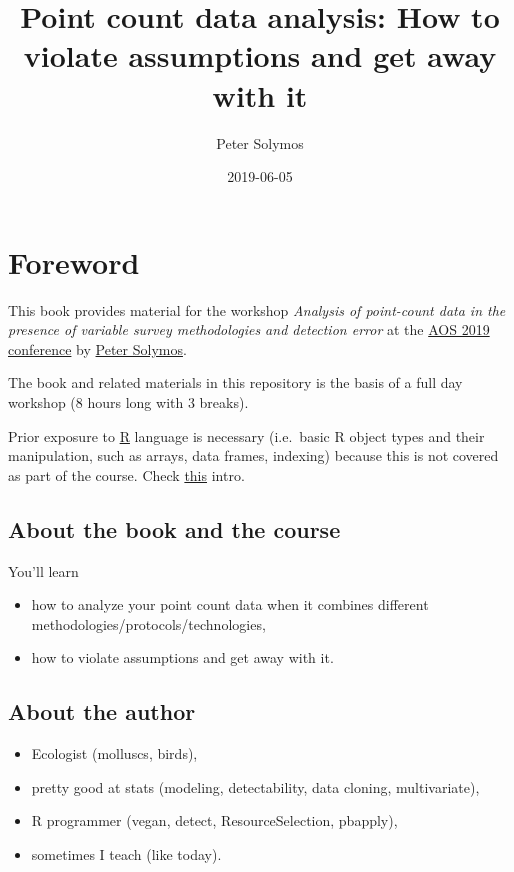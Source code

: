 \documentclass[12pt,]{book}
\title{Point count data analysis: How to violate assumptions and get away with it}
\author{Peter Solymos}
\date{2019-06-05}
\providecommand{\tightlist}{%
  \setlength{\itemsep}{0pt}\setlength{\parskip}{0pt}}
\begin{document}
\maketitle

{
\hypersetup{linkcolor=black}
\setcounter{tocdepth}{2}
\tableofcontents
}
\listoftables
\listoffigures
\hypertarget{foreword}{%
\chapter*{Foreword}\label{foreword}}

This book provides material for the workshop
\emph{Analysis of point-count data in the presence of variable survey methodologies and detection error}
at the \href{https://amornithmeeting.org/}{AOS 2019 conference}
by \href{http://peter.solymos.org}{Peter Solymos}.

The book and related materials in this repository is the basis of a
full day workshop (8 hours long with 3 breaks).

Prior exposure to \href{https://www.r-project.org/}{R} language is necessary
(i.e.~basic R object types and their manipulation, such as arrays, data frames, indexing)
because this is not covered as part of the course.
Check \href{_etc/R-basics.pdf}{this} intro.

\hypertarget{about-the-book-and-the-course}{%
\section{About the book and the course}\label{about-the-book-and-the-course}}

You'll learn

\begin{itemize}
\tightlist
\item
  how to analyze your point count data when it combines different methodologies/protocols/technologies,
\item
  how to violate assumptions and get away with it.
\end{itemize}

\hypertarget{about-the-author}{%
\section{About the author}\label{about-the-author}}

\begin{itemize}
\tightlist
\item
  Ecologist (molluscs, birds),
\item
  pretty good at stats (modeling, detectability, data cloning, multivariate),
\item
  R programmer (vegan, detect, ResourceSelection, pbapply),
\item
  sometimes I teach (like today).
\end{itemize}
\end{document}
